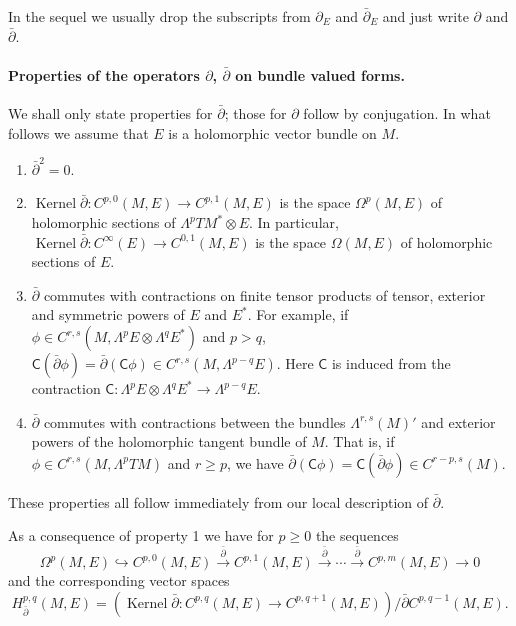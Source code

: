 In the sequel we usually drop the subscripts from $\partial_E$ and $\bar\partial_E$ and just write $\partial$ and $\bar\partial$.
\paragraph{Properties of the operators $\partial$, $\bar\partial$ on bundle valued forms.} We shall only state properties for $\bar\partial$; those for $\partial$ follow by conjugation. In what follows we assume that $E$ is a holomorphic vector bundle on $M$.
\begin{enumerate}
\item $\bar\partial^2=0$.
\item $\operatorname{Kernel}\bar\partial:C^{p,0}(M,E)\to C^{p,1}(M,E)$ is the space $\Omega^p(M,E)$ of holomorphic sections of $\Lambda^pTM^*\otimes E$. In particular, $\operatorname{Kernel}\bar\partial:C^\infty(E)\to C^{0,1}(M,E)$ is the space $\Omega(M,E)$ of holomorphic sections of $E$.
\item $\bar\partial$ commutes with contractions on finite tensor products of tensor, exterior and symmetric powers of $E$ and $E^*$. For example, if
$\phi\in C^{r,s}(M,\Lambda^pE\otimes\Lambda^qE^*)$ and $p>q$, $\mathsf C(\bar\partial\phi)=\bar\partial(\mathsf C\phi)\in C^{r,s}(M,\Lambda^{p-q}E)$. Here $\mathsf C$ is induced from the contraction $\mathsf C:\Lambda^pE\otimes\Lambda^qE^*\to\Lambda^{p-q}E$.
\item $\bar\partial$ commutes with contractions between the bundles $\Lambda^{r,s}(M)'$ and exterior powers of the holomorphic tangent bundle of $M$. That is, if $\phi\in C^{r,s}(M,\Lambda^pTM)$ and $r\geq p$, we have $\bar\partial(\mathsf C\phi)=\mathsf C(\bar\partial\phi)\in C^{r-p,s}(M)$.
\end{enumerate}
These properties all follow immediately from our local description of $\bar\partial$.

As a consequence of property 1 we have for $p\geq0$ the sequences
\[\Omega^p(M,E)\hookrightarrow C^{p,0}(M,E)\xrightarrow{\bar\partial}C^{p,1}(M,E)\xrightarrow{\bar\partial}\cdots\xrightarrow{\bar\partial}C^{p,m}(M,E)\to0\]
and the corresponding vector spaces
\[H_{\bar\partial}^{p,q}(M,E)=(\operatorname{Kernel}\bar\partial:C^{p,q}(M,E)\to C^{p,q+1}(M,E))/\bar\partial C^{p,q-1}(M,E).\]
